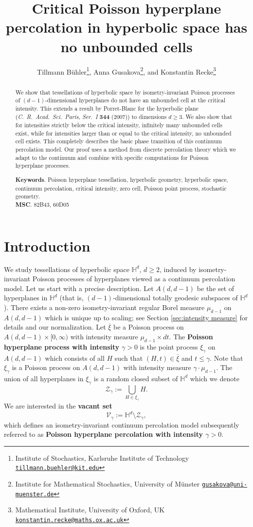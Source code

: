 \documentclass[12pt,a4paper]{article}
\title{Critical Poisson hyperplane percolation in hyperbolic space has no unbounded cells}
\author{Tillmann B{\"u}hler\thanks{Institute of Stochastics, Karlsruhe Institute of Technology   \href{mailto:tillmann.buehler@kit.ed}{\texttt{tillmann.buehler@kit.edu}}}, Anna Gusakova\thanks{Institute for Mathematical Stochastics, University of M\"unster \href{mailto:gusakova@uni-muenster.de}{\texttt{gusakova@uni-muenster.de}}}, and Konstantin Recke\thanks{Mathematical Institute, University of Oxford, UK  \href{mailto:konstantin.recke@maths.ox.ac.uk}{\texttt{konstantin.recke@maths.ox.ac.uk}}}}
\date{}
\theoremstyle{definition}
\renewcommand{\H}{\mathbb{H}}
\begin{document}
\maketitle
\begin{abstract}
    We show that tessellations of hyperbolic space by isometry-invariant Poisson processes of $(d-1)$-dimensional hyperplanes do not have an unbounded cell at the critical intensity. This extends a result by Porret-Blanc for the hyperbolic plane ({\em C.~R.~Acad.~Sci.~Paris, Ser.~I} {\bf 344} (2007)) to dimensions $d\ge3$. We also show that for intensities strictly below the critical intensity, infinitely many unbounded cells exist, while for intensities larger than or equal to the critical intensity, no unbounded cell exists. This completely describes the basic phase transition of this continuum percolation model. Our proof uses a method from discrete percolation theory which we adapt to the continuum and combine with specific computations for Poisson hyperplane processes.

    \medskip
    \noindent
    {\bf Keywords}. {Poisson hyperplane tessellation, hyperbolic geometry, hyperbolic space, continuum percolation, critical intensity, zero cell, Poisson point process, stochastic geometry.}\\
    {\bf MSC}. 82B43, 60D05
\end{abstract}



\section{Introduction}

We study tessellations of hyperbolic space $\mathbb H^d$, $d\ge2$, induced by isometry-invariant Poisson processes of hyperplanes viewed as a continuum percolation model. Let us start with a precise description.
Let $A(d,d-1)$ be the set of hyperplanes in $\mathbb H^d$ (that is, \((d-1)\)-dimensional totally geodesic subspaces of \(\H^d\)).
There exists a non-zero isometry-invariant regular Borel measure $\mu_{d-1}$ on $A(d,d-1)$ which is unique up to scaling; see Section \ref{sec:intensity measure} for details and our normalization.
Let $\bar\xi$ be a Poisson process on $A(d,d-1)\times[0,\infty)$ with intensity measure $\mu_{d-1}\times d t$.
The {\bf Poisson hyperplane process with intensity} $\gamma>0$ is the point process $\xi_\gamma$ on $A(d,d-1)$ which consists of all $H$ such that $(H,t)\in \bar\xi$ and $t\le\gamma$.
Note that $\xi_\gamma$ is a Poisson process on $A(d,d-1)$ with intensity measure $\gamma\cdot\mu_{d-1}$.
The union of all hyperplanes in \(\xi_\gamma\) is a random closed subset of \(\H^d\) which we denote
\begin{equation} \label{def-Z}
\mathcal Z_\gamma := \bigcup_{H\in\xi_\gamma} H.
\end{equation}
We are interested in the {\bf vacant set}
\begin{equation} \label{def-V}
\mathcal V_\gamma := \mathbb H^d \setminus \mathcal Z_\gamma,
\end{equation}
which defines an isometry-invariant continuum percolation model subsequently referred to as {\bf Poisson hyperplane percolation with intensity $\gamma>0$}. 
\end{document}
